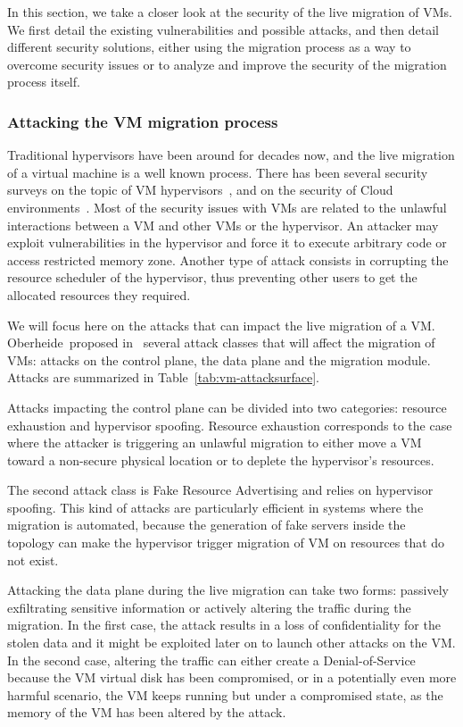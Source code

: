 In this section, we take a closer look at the security of the live migration of VMs.
We first detail the existing vulnerabilities and possible attacks, and then detail different security solutions, either using the migration process as a way to overcome security issues or to analyze and improve the security of the migration process itself.

\subsubsection{Attacking the VM migration process}
Traditional hypervisors have been around for decades now, and the live migration of a virtual machine is a well known process. There has been several security surveys on the topic of VM hypervisors~\cite{Reuben2007,Rehman2013,Sahoo2010,Perez-Botero2013}, and on the security of Cloud environments~\cite{cloudenvironmentsecuritysurvey-fernandes2014}.
Most of the security issues with VMs are related to the unlawful interactions between a VM and other VMs or the hypervisor.
An attacker may exploit vulnerabilities in the hypervisor and force it to execute arbitrary code or access restricted memory zone.
Another type of attack consists in corrupting the resource scheduler of the hypervisor, thus preventing other users to get the allocated resources they required.

We will focus here on the attacks that can impact the live migration of a VM.
Oberheide~\etal proposed in~\cite{empirical-oberheide2008} several attack classes that will affect the migration of VMs: attacks on the control plane, the data plane and the migration module.
Attacks are summarized in Table~\ref{tab:vm-attacksurface}.

Attacks impacting the control plane can be divided into two categories: resource exhaustion and hypervisor spoofing. Resource exhaustion corresponds to the case where the attacker is triggering an unlawful migration to either move a VM toward a non-secure physical location or to deplete the hypervisor's resources.

The second attack class is Fake Resource Advertising and relies on hypervisor spoofing. This kind of attacks are particularly efficient in systems where the migration is automated, because the generation of fake servers inside the topology can make the hypervisor trigger migration of VM on resources that do not exist.

Attacking the data plane during the live migration can take two forms: passively exfiltrating sensitive information or actively altering the traffic during the migration.
In the first case, the attack results in a loss of confidentiality for the stolen data and it might be exploited later on to launch other attacks on the VM.
In the second case, altering the traffic can either create a Denial-of-Service because the VM virtual disk has been compromised, or in a potentially even more harmful scenario, the VM keeps running but under a compromised state, as the memory of the VM has been altered by the attack.

